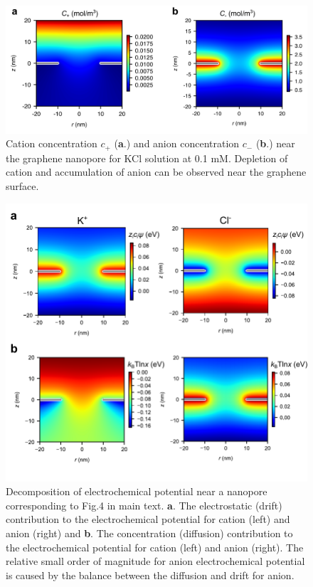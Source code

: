 \documentclass[manuscript=suppinfo,email=true, hyperref=true, keywords=false]{achemso}
\newcommand{\Fig}{Fig.}
\begin{document}
\begin{figure}[htbp]
  \centering
  \includegraphics[width=0.8\linewidth]{img/SI-concentration.png}
  \caption{Cation concentration $c_{+}$ (\textbf{a}.) and anion
    concentration $c_{-}$ (\textbf{b}.) near the graphene nanopore for
    KCl solution at 0.1 mM. Depletion of cation and accumulation of
    anion can be observed near the graphene surface.}
  \label{fig:conc}
\end{figure}

\begin{figure}[htbp]
  \centering
  \includegraphics[width=0.8\linewidth]{img/SI-electrochemical-decomposite.pdf}
  \caption{Decomposition of electrochemical potential near a nanopore
    corresponding to \Fig 4 in main text. \textbf{a}. The electrostatic
    (drift) contribution to the electrochemical potential for cation
    (left) and anion (right) and \textbf{b}. The concentration (diffusion)
    contribution to the electrochemical potential for cation (left)
    and anion (right). The relative small order of magnitude for anion
    electrochemical potential is caused by the balance between the
    diffusion and drift for anion.}
  \label{fig:potential}
\end{figure}
\end{document}
